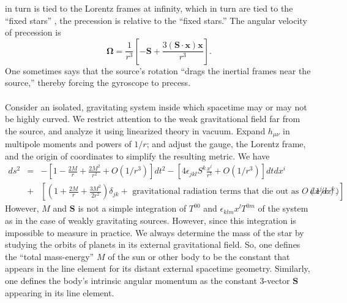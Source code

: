 in turn is tied to the Lorentz frames at infinity, which in turn are tied to the ``fixed stars'' , the precession is relative to the ``fixed stars.'' 
The angular velocity of precession is
\[\bm{\Omega} = \frac{1}{r^3} \left[ -\bm{S} + \frac{3(\bm{S}\cdot \bm{x})\bm{x}}{r^3} \right] .\]
One sometimes says that the source's rotation ``drags the inertial frames near the source,'' thereby forcing the gyroscope to precess.
\\ \\
Consider an isolated, gravitating system inside which spacetime may or may not be highly curved. We restrict attention to the weak gravitational field far from the source, and analyze it using linearized theory in vacuum.
Expand $h_{\mu\nu}$ in multipole moments and powers of $1/r$; and adjust the gauge, the Lorentz frame, and the origin of coordinates to simplify the resulting metric.
We have
\begin{eqnarray}
ds^2 &=& -\left[1-\frac{2M}{r} + \frac{2M^2}{r^2} + O({1}/{r^3}) \right]dt^2 - \left[4\epsilon_{jkl}S^k \frac{x^l}{r^3} + O({1}/{r^3})  \right] dtdx^i  \nonumber \\
&+& \left[(1+\frac{2M}{r} + \frac{3M^2}{2r^2})\delta_{jk} + \mbox{ gravitational radiation terms that die out as } O({1}/{r}) ) \right]dx^j dx^k. \nonumber
\end{eqnarray}
However, $M$ and $\bm{S}$ is not a simple integration of $T^{00}$ and $\epsilon_{klm} x^l T^{0m}$ of the system as in the case of weakly gravitating sources.
However, since this integration is impossible to measure in practice. We always determine the mass of the star by studying the orbits of planets in its external gravitational field. So, one defines the ``total mass-energy'' $M$ of the sun or other body to be the constant that appears in the line element for its distant external spacetime geometry. Similarly, one defines the body's intrinsic angular momentum as the constant 3-vector $\bm{S}$ appearing in its line element.

